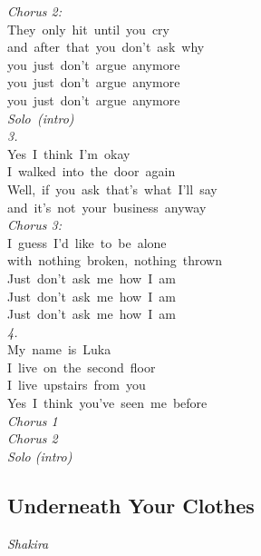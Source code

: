 \documentclass[10pt,twocolumn,a4paper]{article}
\begin{document}
\textit{Chorus 2:}\\
{They~only~hit~until~you~cry}\\
{and~after~that~you~don't~ask~why}\\
{you~just~don't~argue~anymore}\\
{you~just~don't~argue~anymore}\\
{you~just~don't~argue~anymore}\\

\textit{Solo~(intro)}\\

\textit{3.}\\
{Yes~I~think~I'm~okay}\\
{I~walked~into~the~door~again}\\
{Well,~if~you~ask~that's~what~I'll~say}\\
{and~it's~not~your~business~anyway}\\

\textit{Chorus 3:}\\
{I~guess~I'd~like~to~be~alone}\\
{with~nothing~broken,~nothing~thrown~}\\
{Just~don't~ask~me~how~I~am}\\
{Just~don't~ask~me~how~I~am}\\
{Just~don't~ask~me~how~I~am}\\


\textit{4. }\\
{My~name~is~Luka}\\
{I~live~on~the~second~floor}\\
{I~live~upstairs~from~you}\\
{Yes~I~think~you've~seen~me~before~}\\


\textit{Chorus 1}\\


\textit{Chorus 2}\\


\textit{Solo (intro)}

\newpage{}
\begin{center} \section*{Underneath Your Clothes}\end{center}
\begin{center}\it Shakira\end{center}
\end{document}
